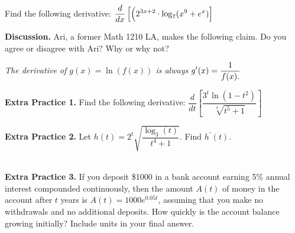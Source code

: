 \documentclass[10pt]{article}
\begin{document}
 Find the following derivative: $\displaystyle \frac{d}{dx}\left[\Big(2^{3x+2}\cdot   \log_7(x^9+e^x) \right]$\\


    \vfill

\newpage%

{\bf\color{blue}Discussion.} Ari, a former Math 1210 LA, makes the following claim. Do you agree or disagree with Ari? Why or why not?
\begin{center}{\em  The derivative of $g(x)=\ln(f(x))$ is always $\displaystyle g^{\prime}(x)=\frac{1}{f(x).}$} \end{center}



\vspace{2in}

{\bf\color{blue} Extra Practice 1.} \reversemarginpar {}  Find the following derivative:  $\dfrac{d}{dt}\left[\dfrac{3^t\ln(1-t^2)}{\sqrt[4]{t^5+1}}\right]$\\

\newpage
\vfill
{\bf\color{blue} Extra Practice 2.} \reversemarginpar {}  Let $h(t)=2^t\sqrt{\dfrac{\log_3(t)}{t^4+1}}$. Find $h^{\prime}(t)$.\\\\
   

{\bf\color{blue} Extra Practice 3.} If you deposit \$1000 in a bank account earning 5\% annual interest compounded continuously, then the amount $A(t)$ of money in the account after $t$ years is $A(t) = 1000e^{0.05 t}$, assuming that you make no withdrawals and no additional deposits.  How quickly is the account balance growing initially? Include units in your final answer. 
    
        
\end{document}
